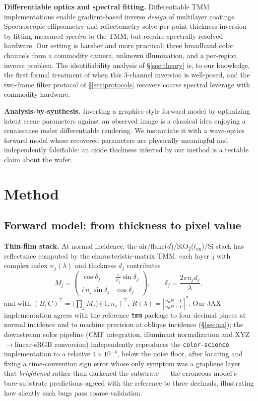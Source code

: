 \documentclass[10pt]{article}
\begin{document}
\textbf{Differentiable optics and spectral fitting.} Differentiable TMM implementations \cite{byrnes2016,luce2022} enable gradient-based inverse \emph{design} of multilayer coatings. Spectroscopic ellipsometry and reflectometry solve per-point thickness inversion by fitting measured \emph{spectra} to the TMM, but require spectrally resolved hardware. Our setting is harsher and more practical: three broadband color channels from a commodity camera, unknown illumination, and a per-region inverse problem. The identifiability analysis of \S\ref{sec:theory} is, to our knowledge, the first formal treatment of when this 3-channel inversion is well-posed, and the two-frame filter protocol of \S\ref{sec:protocols} recovers coarse spectral leverage with commodity hardware.

\textbf{Analysis-by-synthesis.} Inverting a graphics-style forward model by optimizing latent scene parameters against an observed image is a classical idea enjoying a renaissance under differentiable rendering. We instantiate it with a wave-optics forward model whose recovered parameters are physically meaningful and independently falsifiable: an oxide thickness inferred by our method is a testable claim about the wafer.

\section{Method}\label{sec:method}

\subsection{Forward model: from thickness to pixel value}

\textbf{Thin-film stack.} At normal incidence, the air/flake($d$)/SiO$_2$($t_{\mathrm{ox}}$)/Si stack has reflectance computed by the characteristic-matrix TMM: each layer $j$ with complex index $n_j(\lambda)$ and thickness $d_j$ contributes
\begin{equation}
M_j=\begin{pmatrix}\cos\delta_j & \tfrac{i}{n_j}\sin\delta_j\\ i\,n_j\sin\delta_j & \cos\delta_j\end{pmatrix},\qquad \delta_j=\frac{2\pi n_j d_j}{\lambda},
\end{equation}
and with $(B,C)^\top=\big(\prod_j M_j\big)(1,n_s)^\top$, $R(\lambda)=\left|\tfrac{n_0B-C}{n_0B+C}\right|^2$. Our JAX implementation agrees with the reference \texttt{tmm} package \cite{byrnes2016} to four decimal places at normal incidence and to machine precision at oblique incidence (\S\ref{sec:na}); the downstream color pipeline (CMF integration, illuminant normalization and XYZ$\to$linear-sRGB conversion) independently reproduces the \texttt{color-science} implementation to a relative $4\times10^{-4}$, below the noise floor, after locating and fixing a time-convention sign error whose only symptom was a graphene layer that \emph{brightened} rather than darkened the substrate --- the erroneous model's bare-substrate predictions agreed with the reference to three decimals, illustrating how silently such bugs pass coarse validation.
\end{document}
